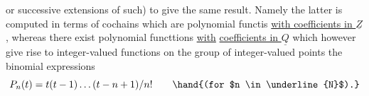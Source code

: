 
or successive extensions of such) to give the same result.  Namely 
the latter is computed in terms of cochains which are polynomial functis
\uline{with coefficients in $\underline{Z}$} ,  whereas there exist polynomial functtions \uline{with}
\uline{coefficients in $\underline{Q}$}  which\hand{,} however\hand{,} give rise to integer-valued functions on
the group of integer-valued points   the binomial expressions
\[ P_n(t) = t(t-1)\dots(t-n+1)/n! \qquad \hand{(for $n \in \underline{N}$).} \]


